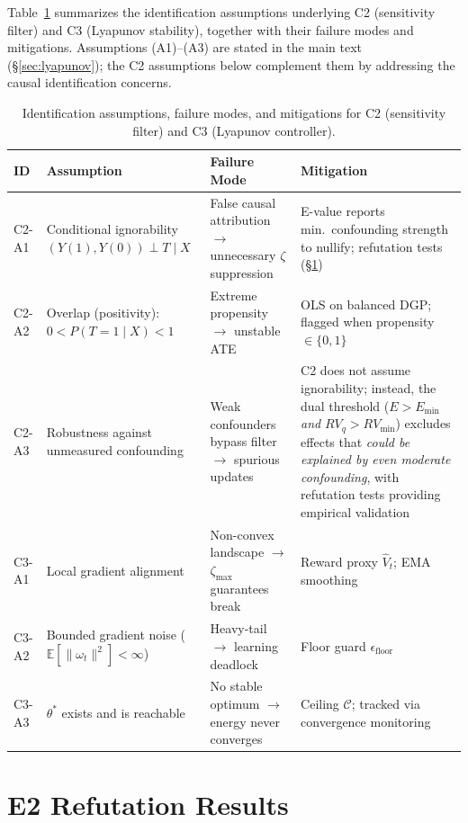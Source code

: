 \documentclass{article}
\begin{document}
Table~\ref{tab:assumptions} summarizes the identification assumptions
underlying C2 (sensitivity filter) and C3 (Lyapunov stability),
together with their failure modes and mitigations.
Assumptions (A1)--(A3) are stated in the main text
(\S\ref{sec:lyapunov}); the C2 assumptions below complement them
by addressing the causal identification concerns.

\begin{table}[h]
\centering
\caption{Identification assumptions, failure modes, and mitigations
  for C2 (sensitivity filter) and C3 (Lyapunov controller).}
\label{tab:assumptions}
\small
\begin{tabular}{@{}p{1.2cm}p{3.2cm}p{3.5cm}p{3.8cm}@{}}
\toprule
\textbf{ID} & \textbf{Assumption} & \textbf{Failure Mode} & \textbf{Mitigation} \\
\midrule
C2-A1 & Conditional ignorability $(Y(1),Y(0)) \perp T \mid X$
  & False causal attribution $\to$ unnecessary $\zeta$ suppression
  & E-value reports min.\ confounding strength to nullify; refutation tests (\S\ref{sec:refutation-app}) \\
C2-A2 & Overlap (positivity): $0 < P(T{=}1 \mid X) < 1$
  & Extreme propensity $\to$ unstable ATE
  & OLS on balanced DGP; flagged when propensity $\in \{0,1\}$ \\
C2-A3 & Robustness against unmeasured confounding
  & Weak confounders bypass filter $\to$ spurious updates
  & C2 does not assume ignorability; instead, the dual threshold
    ($E > E_{\min}$ \emph{and} $RV_q > RV_{\min}$) excludes effects
    that \emph{could be explained by even moderate confounding},
    with refutation tests providing empirical validation \\
\midrule
C3-A1 & Local gradient alignment
  & Non-convex landscape $\to$ $\zeta_{\max}$ guarantees break
  & Reward proxy $\hat{V}_t$; EMA smoothing \\
C3-A2 & Bounded gradient noise ($\mathbb{E}[\|\omega_t\|^2] < \infty$)
  & Heavy-tail $\to$ learning deadlock
  & Floor guard $\epsilon_{\text{floor}}$ \\
C3-A3 & $\theta^*$ exists and is reachable
  & No stable optimum $\to$ energy never converges
  & Ceiling $\mathcal{C}$; tracked via convergence monitoring \\
\bottomrule
\end{tabular}
\end{table}


\section{E2 Refutation Results}
\label{sec:refutation-app}
\end{document}
